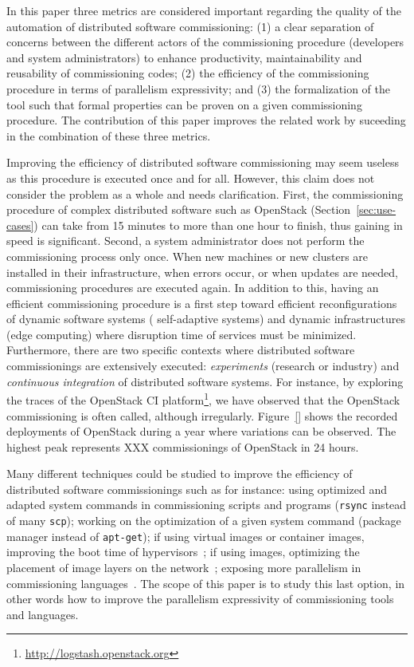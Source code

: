 In this paper three metrics are considered important regarding the
quality of the automation of distributed software commissioning: (1) a
clear separation of concerns between the different actors of the
commissioning procedure (\ie developers and system administrators) to
enhance productivity, maintainability and reusability of commissioning
codes; (2) the efficiency of the commissioning procedure in terms of
parallelism expressivity; and (3) the formalization of the tool such
that formal properties can be proven on a given commissioning
procedure. The contribution of this paper improves the related work by
suceeding in the combination of these three metrics.

Improving the efficiency of distributed software commissioning may
seem useless as this procedure is executed once and for all. However,
this claim does not consider the problem as a whole and needs
clarification.
%
First, the commissioning procedure of complex distributed software
such as OpenStack (Section~\ref{sec:use-cases}) can take from 15
minutes to more than one hour to finish, thus gaining in speed is
significant. Second, a system administrator does not perform the
commissioning process only once. When new machines or new clusters are
installed in their infrastructure, when errors occur, or when updates
are needed, commissioning procedures are executed again. In addition
to this, having an efficient commissioning procedure is a first step
toward efficient reconfigurations of dynamic software systems (\eg
self-adaptive systems) and dynamic infrastructures (\eg edge
computing) where disruption time of services must be minimized.
Furthermore, there are two specific contexts where distributed
software commissionings are extensively executed: \emph{experiments}
(research or industry) and \emph{continuous integration} of
distributed software systems. For instance, by exploring the traces of
the OpenStack CI
platform\footnote{\url{http://logstash.openstack.org}}, we have
observed that the OpenStack commissioning is often called, although
irregularly. Figure~\ref{} shows the recorded deployments of OpenStack
during a year where variations can be observed. The highest peak
represents XXX commissionings of OpenStack in 24 hours.
%

Many different techniques could be studied to improve the efficiency
of distributed software commissionings such as for instance: using
optimized and adapted system commands in commissioning scripts and
programs (\eg \texttt{rsync} instead of many \texttt{scp}); working on
the optimization of a given system command (\eg \nix package manager
instead of \texttt{apt-get}); if using virtual images or container
images, improving the boot time of
hypervisors~\cite{nguyen:hal-02172288}; if using \docker images,
optimizing the placement of image layers on the
network~\cite{darrous:hal-01745405}; exposing more parallelism in
commissioning languages~\cite{dicosmo:hal-01233489}. The scope of this
paper is to study this last option, in other words how to improve the
parallelism expressivity of commissioning tools and languages.

